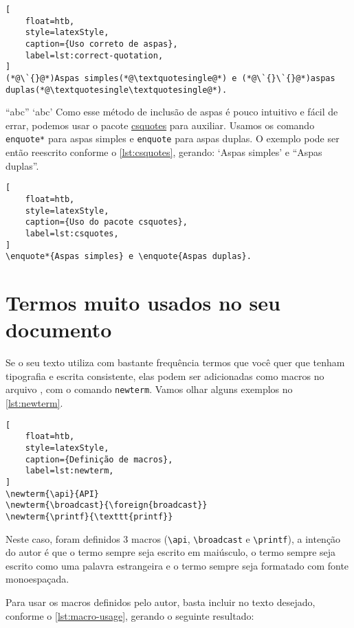 \begin{lstlisting}[
    float=htb, 
    style=latexStyle, 
    caption={Uso correto de aspas},
    label=lst:correct-quotation,
]
(*@\`{}@*)Aspas simples(*@\textquotesingle@*) e (*@\`{}\`{}@*)aspas duplas(*@\textquotesingle\textquotesingle@*).
\end{lstlisting}


\enquote{abc}
\enquote*{abc}
Como esse método de inclusão de aspas é pouco intuitivo e fácil de errar, podemos usar o pacote \href{https://ctan.org/pkg/csquotes}{csquotes} para auxiliar. Usamos os comando \texttt{enquote*} para aspas simples e \texttt{enquote} para aspas duplas.
O exemplo pode ser então reescrito conforme o \autoref{lst:csquotes}, gerando:
\enquote*{Aspas simples} e \enquote{Aspas duplas}.

\begin{lstlisting}[
    float=htb, 
    style=latexStyle, 
    caption={Uso do pacote csquotes},
    label=lst:csquotes,
]
\enquote*{Aspas simples} e \enquote{Aspas duplas}.
\end{lstlisting}

\section{Termos muito usados no seu documento}

Se o seu texto utiliza com bastante frequência termos que você quer que tenham tipografia e escrita consistente, elas podem ser adicionadas como macros no arquivo \macrofile, com o comando \texttt{newterm}. Vamos olhar alguns exemplos no \autoref{lst:newterm}.

\begin{lstlisting}[
    float=htb, 
    style=latexStyle, 
    caption={Definição de macros},
    label=lst:newterm,
]
\newterm{\api}{API}
\newterm{\broadcast}{\foreign{broadcast}}
\newterm{\printf}{\texttt{printf}}
\end{lstlisting}

Neste caso, foram definidos 3 macros (\texttt{\textbackslash api}, \texttt{\textbackslash broadcast} e \texttt{\textbackslash printf}), a intenção do autor é que o termo \api sempre seja escrito em maiúsculo, o termo \broadcast sempre seja escrito como uma palavra estrangeira e o termo \printf sempre seja formatado com fonte monoespaçada.

Para usar os macros definidos pelo autor, basta incluir no texto desejado, conforme o \autoref{lst:macro-usage}, gerando o seguinte resultado:

